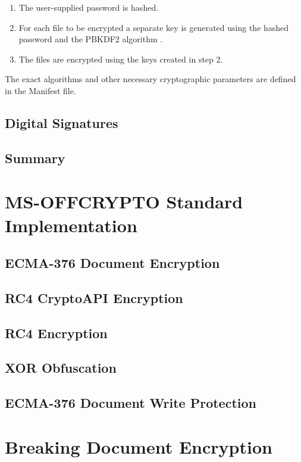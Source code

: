 \documentclass[11pt,oneside]{fithesis2}
\begin{document}
\begin{enumerate}
\setlength\itemsep{0.1em}
	\item{The user-supplied password is hashed.}
	\item{For each file to be encrypted a separate key is generated using the hashed password and the PBKDF2 algorithm \cite{rfc2898}.}
	\item{The files are encrypted using the keys created in step 2.}
\end{enumerate}

The exact algorithms and other necessary cryptographic parameters are defined in the Manifest file.


\section{Digital Signatures}

\section{Summary}

\chapter{MS-OFFCRYPTO Standard Implementation}

\section{ECMA-376 Document Encryption}

\section{RC4 CryptoAPI Encryption}

\section{RC4 Encryption}

\section{XOR Obfuscation}

\section{ECMA-376 Document Write Protection}

\chapter{Breaking Document Encryption}
\end{document}
